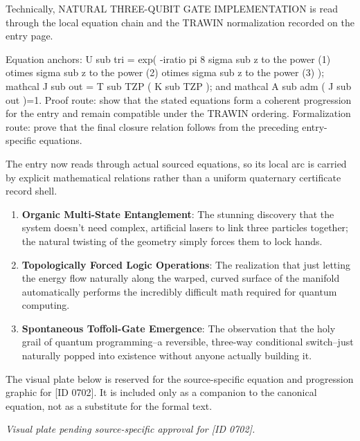 Technically, NATURAL THREE-QUBIT GATE IMPLEMENTATION is read through the local equation chain and the TRAWIN normalization recorded on the entry page.

Equation anchors: U sub tri = exp( -iratio pi 8 sigma sub z to the power (1) otimes sigma sub z to the power (2) otimes sigma sub z to the power (3) ); mathcal J sub out = T sub TZP ( K sub TZP ); and mathcal A sub adm ( J sub out )=1. Proof route: show that the stated equations form a coherent progression for the entry and remain compatible under the TRAWIN ordering. Formalization route: prove that the final closure relation follows from the preceding entry-specific equations.

The entry now reads through actual sourced equations, so its local arc is carried by explicit mathematical relations rather than a uniform quaternary certificate record shell.
\endgroup

\begin{enumerate}[leftmargin=1.6em,itemsep=6pt,topsep=4pt]
\item \textbf{Organic Multi-State Entanglement}: The stunning discovery that the system doesn't need complex, artificial lasers to link three particles together; the natural twisting of the geometry simply forces them to lock hands.
\item \textbf{Topologically Forced Logic Operations}: The realization that just letting the energy flow naturally along the warped, curved surface of the manifold automatically performs the incredibly difficult math required for quantum computing.
\item \textbf{Spontaneous Toffoli-Gate Emergence}: The observation that the holy grail of quantum programming--a reversible, three-way conditional switch--just naturally popped into existence without anyone actually building it.
\end{enumerate}

\begingroup\footnotesize\sloppy
The visual plate below is reserved for the source-specific equation and progression graphic for [ID 0702]. It is included only as a companion to the canonical equation, not as a substitute for the formal text.
\par\endgroup
\begingroup\footnotesize\itshape
Visual plate pending source-specific approval for [ID 0702].
\par\endgroup

